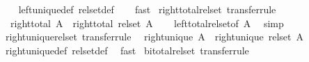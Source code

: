 \begin{isabellebody}
%
\isadelimproof
\ \ %
\endisadelimproof
%
\isatagproof
{}\isamarkupfalse%
\ left{\isacharunderscore}{\kern0pt}unique{\isacharunderscore}{\kern0pt}def\ rel{\isacharunderscore}{\kern0pt}set{\isacharunderscore}{\kern0pt}def\isanewline
\ \ \isamarkupfalse%
\ fast%
\endisatagproof
{\isafoldproof}%
%
\isadelimproof
\isanewline
%
\endisadelimproof
\isanewline
{}\isamarkupfalse%
\ right{\isacharunderscore}{\kern0pt}total{\isacharunderscore}{\kern0pt}rel{\isacharunderscore}{\kern0pt}set\ {\isacharbrackleft}{\kern0pt}transfer{\isacharunderscore}{\kern0pt}rule{\isacharbrackright}{\kern0pt}{\isacharcolon}{\kern0pt}\isanewline
\ \ {\isachardoublequoteopen}right{\isacharunderscore}{\kern0pt}total\ A\ {\isasymLongrightarrow}\ right{\isacharunderscore}{\kern0pt}total\ {\isacharparenleft}{\kern0pt}rel{\isacharunderscore}{\kern0pt}set\ A{\isacharparenright}{\kern0pt}{\isachardoublequoteclose}\isanewline
%
\isadelimproof
\ \ %
\endisadelimproof
%
\isatagproof
{}\isamarkupfalse%
\ left{\isacharunderscore}{\kern0pt}total{\isacharunderscore}{\kern0pt}rel{\isacharunderscore}{\kern0pt}set{\isacharbrackleft}{\kern0pt}of\ {\isachardoublequoteopen}A{\isasyminverse}{\isasyminverse}{\isachardoublequoteclose}{\isacharbrackright}{\kern0pt}\ \isamarkupfalse%
\ simp%
\endisatagproof
{\isafoldproof}%
%
\isadelimproof
\isanewline
%
\endisadelimproof
\isanewline
{}\isamarkupfalse%
\ right{\isacharunderscore}{\kern0pt}unique{\isacharunderscore}{\kern0pt}rel{\isacharunderscore}{\kern0pt}set\ {\isacharbrackleft}{\kern0pt}transfer{\isacharunderscore}{\kern0pt}rule{\isacharbrackright}{\kern0pt}{\isacharcolon}{\kern0pt}\isanewline
\ \ {\isachardoublequoteopen}right{\isacharunderscore}{\kern0pt}unique\ A\ {\isasymLongrightarrow}\ right{\isacharunderscore}{\kern0pt}unique\ {\isacharparenleft}{\kern0pt}rel{\isacharunderscore}{\kern0pt}set\ A{\isacharparenright}{\kern0pt}{\isachardoublequoteclose}\isanewline
%
\isadelimproof
\ \ %
\endisadelimproof
%
\isatagproof
{}\isamarkupfalse%
\ right{\isacharunderscore}{\kern0pt}unique{\isacharunderscore}{\kern0pt}def\ rel{\isacharunderscore}{\kern0pt}set{\isacharunderscore}{\kern0pt}def\ \isamarkupfalse%
\ fast%
\endisatagproof
{\isafoldproof}%
%
\isadelimproof
\isanewline
%
\endisadelimproof
\isanewline
{}\isamarkupfalse%
\ bi{\isacharunderscore}{\kern0pt}total{\isacharunderscore}{\kern0pt}rel{\isacharunderscore}{\kern0pt}set\ {\isacharbrackleft}{\kern0pt}transfer{\isacharunderscore}{\kern0pt}rule{\isacharbrackright}{\kern0pt}{\isacharcolon}{\kern0pt}\isanewline

\end{isabellebody}

